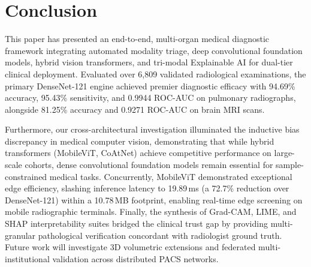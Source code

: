\documentclass[journal]{IEEEtran}
\begin{document}
\section{Conclusion}
This paper has presented an end-to-end, multi-organ medical diagnostic framework integrating automated modality triage, deep convolutional foundation models, hybrid vision transformers, and tri-modal Explainable AI for dual-tier clinical deployment. Evaluated over 6,809 validated radiological examinations, the primary DenseNet-121 engine achieved premier diagnostic efficacy with 94.69\% accuracy, 95.43\% sensitivity, and 0.9944 ROC-AUC on pulmonary radiographs, alongside 81.25\% accuracy and 0.9271 ROC-AUC on brain MRI scans. 

Furthermore, our cross-architectural investigation illuminated the inductive bias discrepancy in medical computer vision, demonstrating that while hybrid transformers (MobileViT, CoAtNet) achieve competitive performance on large-scale cohorts, dense convolutional foundation models remain essential for sample-constrained medical tasks. Concurrently, MobileViT demonstrated exceptional edge efficiency, slashing inference latency to 19.89\,ms (a 72.7\% reduction over DenseNet-121) within a 10.78\,MB footprint, enabling real-time edge screening on mobile radiographic terminals. Finally, the synthesis of Grad-CAM, LIME, and SHAP interpretability suites bridged the clinical trust gap by providing multi-granular pathological verification concordant with radiologist ground truth. Future work will investigate 3D volumetric extensions and federated multi-institutional validation across distributed PACS networks.
\end{document}
